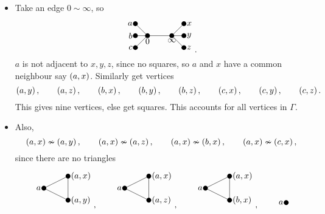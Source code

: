 \begin{example*}
\begin{itemize}
\begin{itemize}
\pagebreak

\item Take an edge $ 0 \sim \infty $, so
$$
\begin{tikzpicture}
\fill (0, 0) circle (0.1) node[below]{$ 0 $};
\fill (1, 0) circle (0.1) node[below]{$ \infty $};
\fill (-0.5, 0.5) circle (0.1) node[left]{$ a $};
\fill (1.5, 0.5) circle (0.1) node[right]{$ x $};
\fill (-0.5, 0) circle (0.1) node[left]{$ b $};
\fill (1.5, 0) circle (0.1) node[right]{$ y $};
\fill (-0.5, -0.5) circle (0.1) node[left]{$ c $};
\fill (1.5, -0.5) circle (0.1) node[right]{$ z $};
\draw (0, 0) to (1, 0);
\draw (0, 0) to (-0.5, 0.5);
\draw (1, 0) to (1.5, 0.5);
\draw (0, 0) to (-0.5, 0);
\draw (1, 0) to (1.5, 0);
\draw (0, 0) to (-0.5, -0.5);
\draw (1, 0) to (1.5, -0.5);
\end{tikzpicture}.
$$
$ a $ is not adjacent to $ x, y, z $, since no squares, so $ a $ and $ x $ have a common neighbour say $ \br{a, x} $. Similarly get vertices
$$ \br{a, y}, \qquad \br{a, z}, \qquad \br{b, x}, \qquad \br{b, y}, \qquad \br{b, z}, \qquad \br{c, x}, \qquad \br{c, y}, \qquad \br{c, z}. $$
This gives nine vertices, else get squares. This accounts for all vertices in $ \Gamma $.
\item Also,
$$ \br{a, x} \nsim \br{a, y}, \qquad \br{a, x} \nsim \br{a, z}, \qquad \br{a, x} \nsim \br{b, x}, \qquad \br{a, x} \nsim \br{c, x}, $$
since there are no triangles
$$
\begin{tikzpicture}
\fill (0, 0) circle (0.1) node[left]{$ a $};
\fill (1, 0.5) circle (0.1) node[right]{$ \br{a, x} $};
\fill (1, -0.5) circle (0.1) node[right]{$ \br{a, y} $};
\draw (0, 0) to (1, 0.5);
\draw (0, 0) to (1, -0.5);
\draw (1, 0.5) to (1, -0.5);
\end{tikzpicture},
\qquad
\begin{tikzpicture}
\fill (0, 0) circle (0.1) node[left]{$ a $};
\fill (1, 0.5) circle (0.1) node[right]{$ \br{a, x} $};
\fill (1, -0.5) circle (0.1) node[right]{$ \br{a, z} $};
\draw (0, 0) to (1, 0.5);
\draw (0, 0) to (1, -0.5);
\draw (1, 0.5) to (1, -0.5);
\end{tikzpicture},
\qquad
\begin{tikzpicture}
\fill (0, 0) circle (0.1) node[left]{$ a $};
\fill (1, 0.5) circle (0.1) node[right]{$ \br{a, x} $};
\fill (1, -0.5) circle (0.1) node[right]{$ \br{b, x} $};
\draw (0, 0) to (1, 0.5);
\draw (0, 0) to (1, -0.5);
\draw (1, 0.5) to (1, -0.5);
\end{tikzpicture},
\qquad
\begin{tikzpicture}
\fill (0, 0) circle (0.1) node[left]{$ a $};

\end{tikzpicture}$$
\end{itemize}
\end{itemize}
\end{example*}
